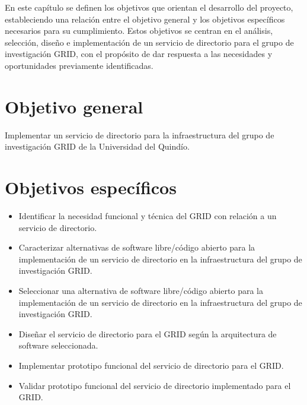 \label{cap:objetivos}
\vspace*{0.7cm}

En este capítulo se definen los objetivos que orientan el desarrollo del proyecto, estableciendo una relación entre el objetivo general y los objetivos específicos necesarios para su cumplimiento. Estos objetivos se centran en el análisis, selección, diseño e implementación de un servicio de directorio para el grupo de investigación \ac{GRID}, con el propósito de dar respuesta a las necesidades y oportunidades previamente identificadas.

\section{Objetivo general}\label{sec:objetivo_general}

Implementar un servicio de directorio para la infraestructura del grupo de investigación \ac{GRID} de la Universidad del Quindío.

\section{Objetivos específicos}\label{sec:objetivos_especificos}
\begin{itemize}
	\item Identificar la necesidad funcional y técnica del \ac{GRID} con relación a un servicio de directorio.
	\item Caracterizar alternativas de software libre/código abierto para la implementación de un servicio de directorio en la infraestructura del grupo de investigación \ac{GRID}.
	\item Seleccionar una alternativa de software libre/código abierto para la implementación de un servicio de directorio en la infraestructura del grupo de investigación \ac{GRID}.
	\item Diseñar el servicio de directorio para el \ac{GRID} según la arquitectura de software seleccionada.
	\item Implementar prototipo funcional del servicio de directorio para el \ac{GRID}.
	\item Validar prototipo funcional del servicio de directorio implementado para el \ac{GRID}.
\end{itemize}
